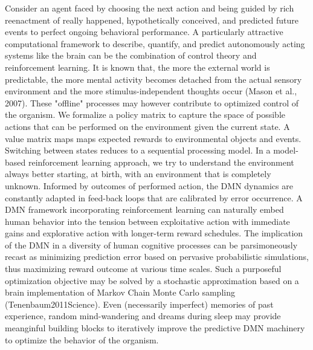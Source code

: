 \documentclass{article} %
\begin{document}
Consider an agent faced by choosing the next action
and being guided by rich
reenactment of really happened, hypothetically conceived, and
predicted future events to perfect ongoing behavioral performance.
A particularly attractive computational framework
to describe, quantify, and predict autonomously acting systems like the brain
can be the combination of control theory and reinforcement learning.
It is known that, the more the external world is predictable,
the more mental activity becomes detached from the actual sensory environment
and the more stimulus-independent thoughts occur
(Mason et al., 2007).
These "offline" processes may however contribute to optimized control of the organism.
We formalize
a policy matrix to capture the space of possible actions that can be performed
on the environment given the current state. A value matrix 
maps maps expected rewards to environmental objects and events.
Switching between states reduces to a sequential processing model.
In a model-based reinforcement learning approach,
we try to understand the environment always better
starting, at birth, with an environment that is completely unknown.
Informed by outcomes of performed action,
the DMN dynamics are constantly adapted in feed-back loops
that are calibrated by error occurrence.
A DMN framework incorporating reinforcement learning
can naturally embed human behavior
into the tension between exploitative action with immediate gains and
explorative action with longer-term reward schedules.
The implication of the DMN in a diversity of human cognitive processes
can be parsimoneously recast as minimizing prediction error
based on pervasive probabilistic simulations,
thus maximizing reward outcome at various time scales.
Such a purposeful optimization objective
may be solved by a stochastic approximation
based on a brain implementation of Markov Chain Monte Carlo sampling
(Tenenbaum2011Science). Even (necessarily imperfect) memories
of past experience, random mind-wandering and dreams during sleep
may provide meanginful building blocks to iteratively improve
the predictive DMN machinery to optimize the behavior of the organism.
\end{document}
